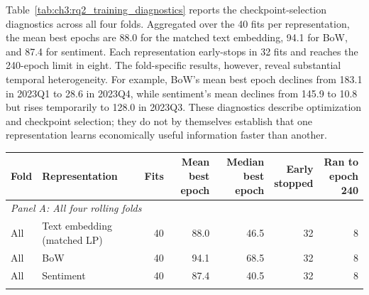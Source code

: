 Table~\ref{tab:ch3:rq2_training_diagnostics} reports the checkpoint-selection
diagnostics across all four folds. Aggregated over the 40 fits per
representation, the mean best epochs are 88.0 for the matched text embedding,
94.1 for BoW, and 87.4 for sentiment. Each representation early-stops in 32
fits and reaches the 240-epoch limit in eight. The fold-specific results,
however, reveal substantial temporal heterogeneity. For example, BoW's mean
best epoch declines from 183.1 in 2023Q1 to 28.6 in 2023Q4, while sentiment's
mean declines from 145.9 to 10.8 but rises temporarily to 128.0 in 2023Q3.
These diagnostics describe optimization and checkpoint selection; they do not
by themselves establish that one representation learns economically useful
information faster than another.

\begin{table}[htbp]
\centering
\scriptsize
\setlength{\tabcolsep}{3.5pt}
\begin{tabular}{@{}llrrrrr@{}}
\toprule
Fold & Representation & Fits
& \shortstack{Mean best\\epoch}
& \shortstack{Median best\\epoch}
& \shortstack{Early\\stopped}
& \shortstack{Ran to\\epoch 240} \\
\midrule
\multicolumn{7}{l}{\textit{Panel A: All four rolling folds}} \\
All & Text embedding (matched LP) & 40 & 88.0 & 46.5 & 32 & 8 \\
All & BoW                         & 40 & 94.1 & 68.5 & 32 & 8 \\
All & Sentiment                   & 40 & 87.4 & 40.5 & 32 & 8 \\
\addlinespace[0.5em]


\end{tabular}
\end{table}
